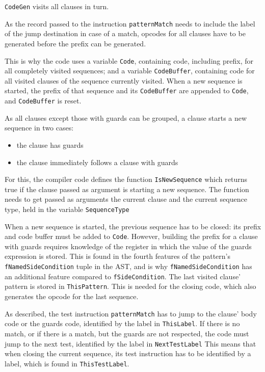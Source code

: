 \documentclass[a4paper]{memoir}
\begin{document}
\lstinline!CodeGen! visits all clauses in turn.

As the record passed to the instruction \lstinline!patternMatch! needs to
include the label of the jump destination in case of a match, opcodes for all
clauses have to be generated before the prefix can be generated.

This is why the code uses a variable \lstinline!Code!, containing code,
including prefix, for all completely visited sequences; and a variable
\lstinline!CodeBuffer!, containing code for all visited clauses of the sequence
currently visited. When a new sequence is started, the prefix of that sequence
and its \lstinline!CodeBuffer! are appended to \lstinline!Code!, and
\lstinline!CodeBuffer! is reset.

As all clauses except those with guards can
be grouped, a clause starts a new sequence in two cases:
\begin{itemize}
  \item the clause has guards
  \item the clause immediately follows a clause with guards
\end{itemize}

For this, the compiler code defines the function
\lstinline!IsNewSequence! which returns true if the clause passed as argument
is starting a new sequence. The function needs to get passed as arguments the current clause and
the current sequence type, held in the variable \lstinline!SequenceType!

\label{sec:codegen:fNamedSideCondition}When a new sequence is started, the previous sequence has to be closed: its
prefix and code buffer must be added to \lstinline!Code!. However, building the
prefix for a clause with guards requires knowledge of the register in which the
value of the guards expression is stored. This is found in the fourth features
of the pattern's \lstinline!fNamedSideCondition! tuple in the AST, and is why
 \lstinline!fNamedSideCondition! has an additional feature compared to
 \lstinline!fSideCondition!.
The last visited clause' pattern is stored in \lstinline!ThisPattern!. This is
needed for the closing code, which also generates the opcode for the last sequence.

As described, the test instruction \lstinline!patternMatch! has to jump to the
clause' body code or the guards code, identified by the label in
\lstinline!ThisLabel!. If there is no match, or if there is a match, but the
guards are not respected, the code must jump to the next test, identified by the
label in \lstinline!NextTestLabel!
This means that when closing the current sequence, its test instruction has to
be identified by a label, which is found in \lstinline!ThisTestLabel!.
\end{document}

